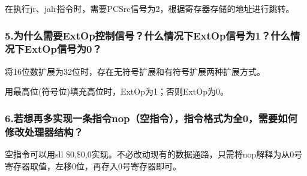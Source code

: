 \documentclass{article}
\begin{document}
            在执行jr、jalr指令时，需要PCSrc信号为2，根据寄存器存储的地址进行跳转。
            \subsubsection*{5.为什么需要ExtOp控制信号？什么情况下ExtOp信号为1？什么情况下ExtOp信号为0？}
            将16位数扩展为32位时，存在无符号扩展和有符号扩展两种扩展方式。

            用最高位(符号位)填充高位时，ExtOp为1；否则ExtOp为0。
            \subsubsection*{6.若想再多实现一条指令nop（空指令），指令格式为全0，需要如何修改处理器结构？}
            空指令可以用sll \$0,\$0,0实现。不必改动现有的数据通路，只需将nop解释为从0号寄存器取值，左移0位，再存入0号寄存器即可。
\end{document}
